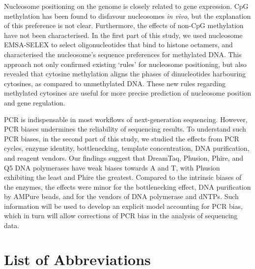 \documentclass[a4paper, numbers=noenddot]{scrbook}
\newenvironment{abstract}%
{\cleardoublepage\null \vfill\begin{center}%
    \bfseries \abstractname \end{center}}%
    {\vfill \null}
\begin{document}
\begin{abstract}
  
  Nucleosome positioning on the genome is closely related to gene expression.  CpG methylation has been found to disfavour nucleosomes \emph{in vivo}, but the explanation of this preference is not clear.  Furthermore, the effects of non-CpG methylation have not been characterised.  In the first part of this study, we used nucleosome EMSA-SELEX to select oligonucleotides that bind to histone octamers, and characterised the nucleosome's sequence preferences for methylated DNA.  This approach not only confirmed existing `rules' for nucleosome positioning, but also revealed that cytosine methylation aligns the phases of dinucleotides harbouring cytosines, as compared to unmethylated DNA.  These new rules regarding methylated cytosines are useful for more precise prediction of nucleosome position and gene regulation.

  PCR is indispensable in most workflows of next-generation sequencing.  However, PCR biases undermines the reliability of sequencing results.  To understand such PCR biases, in the second part of this study, we studied the effects from PCR cycles, enzyme identity, bottlenecking, template concentration, DNA purification, and reagent vendors.  Our findings suggest that DreamTaq, Phusion, Phire, and Q5 DNA polymerases have weak biases towards A and T, with Phusion exhibiting the least and Phire the greatest.  Compared to the intrinsic biases of the enzymes, the effects were minor for the bottlenecking effect, DNA purification by AMPure beads, and for the vendors of DNA polymerase and dNTPs.  Such information will be used to develop an explicit model accounting for PCR bias, which in turn will allow corrections of PCR bias in the analysis of sequencing data.
 
\end{abstract}

\tableofcontents

\chapter*{List of Abbreviations}
\label{ch:abbrev}
\end{document}
